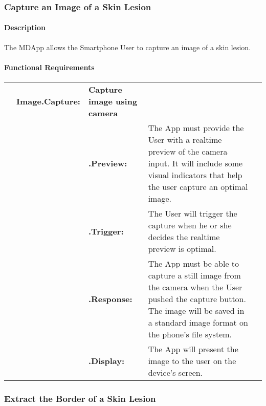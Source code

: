 
        \subsubsection{Capture an Image of a Skin Lesion}
            \paragraph{Description}

            The MDApp allows the Smartphone User to capture an image of a skin lesion.

            \paragraph{Functional Requirements}


                {\renewcommand{\arraystretch}{1.8}%
                \begin{longtable}[H]{ >{\bfseries}l >{\bfseries}l >{\bfseries}l p{9.5cm} l }

                    \hline
                    & \multicolumn{2}{>{\bfseries}l}
                    {Image.Capture:} & \textbf{Capture image using camera}  \\

                    & & .Preview: &  The App must provide the User with a realtime preview of the camera input. It will include some visual indicators that help the user capture an optimal image. \\

                    & & .Trigger: & The User will trigger the capture when he or she decides the realtime preview is optimal. \\

                    & & .Response: & The App must be able to capture a still image from the camera when the User pushed the capture button. The image will be saved in a standard image format on the phone’s file system. \\

                    & & .Display: & The App will present the image to the user on the device’s screen. \\

                    \hline
                \end{longtable}


        \subsubsection{Extract the Border of a Skin Lesion}

}
